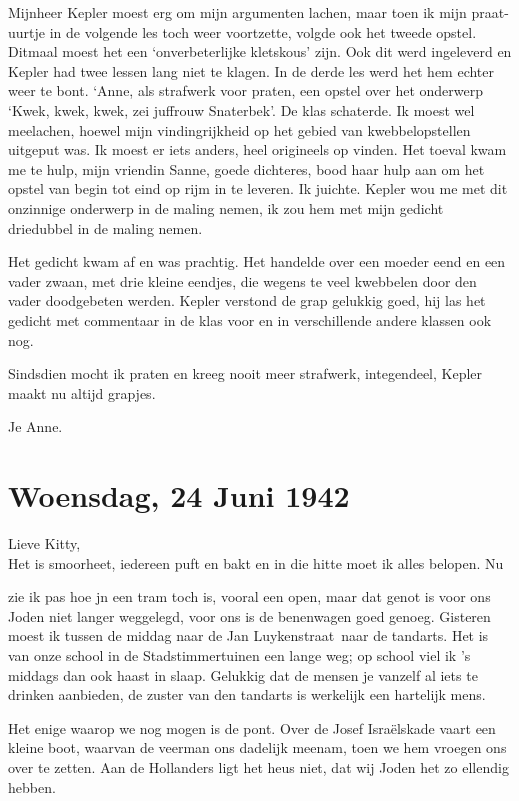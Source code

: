 \documentclass{book}
\begin{document}
Mijnheer Kepler moest erg om mijn argumenten lachen, maar toen ik mijn
praat-uurtje in de volgende les toch weer voortzette, volgde ook het
tweede opstel. Ditmaal moest het een `onverbeterlijke kletskous' zijn.
Ook dit werd ingeleverd en Kepler had twee lessen lang niet te klagen.
In de derde les werd het hem echter weer te bont. `Anne, als strafwerk
voor praten, een opstel over het onderwerp `Kwek, kwek, kwek, zei
juffrouw Snaterbek'. De klas schaterde. Ik moest wel meelachen, hoewel
mijn vindingrijkheid op het gebied van kwebbelopstellen uitgeput was. Ik
moest er iets anders, heel origineels op vinden. Het toeval kwam me te
hulp, mijn vriendin Sanne, goede dichteres, bood haar hulp aan om het
opstel van begin tot eind op rijm in te leveren. Ik juichte. Kepler wou
me met dit onzinnige onderwerp in de maling nemen, ik zou hem met mijn
gedicht driedubbel in de maling nemen.

Het gedicht kwam af en was prachtig. Het handelde over een moeder eend
en een vader zwaan, met drie kleine eendjes, die wegens te veel
kwebbelen door den vader doodgebeten werden. Kepler verstond de grap
gelukkig goed, hij las het gedicht met commentaar in de klas voor en in
verschillende andere klassen ook nog.

Sindsdien mocht ik praten en kreeg nooit meer strafwerk, integendeel,
Kepler maakt nu altijd grapjes.

Je Anne.

\chapter{Woensdag, 24 Juni 1942}

Lieve Kitty,\\Het is smoorheet, iedereen puft en bakt en in die hitte
moet ik alles belopen. Nu

zie ik pas hoe jn een tram toch is, vooral een open, maar dat genot is
voor ons Joden niet langer weggelegd, voor ons is de benenwagen goed
genoeg. Gisteren moest ik tussen de middag naar de Jan Luykenstraat~naar
de tandarts. Het is van onze school in de Stadstimmertuinen een lange
weg; op school viel ik 's middags dan ook haast in slaap. Gelukkig dat
de mensen je vanzelf al iets te drinken aanbieden, de zuster van den
tandarts is werkelijk een hartelijk mens.

Het enige waarop we nog mogen is de pont. Over de Josef Israëlskade
vaart een kleine boot, waarvan de veerman ons dadelijk meenam, toen we
hem vroegen ons over te zetten. Aan de Hollanders ligt het heus niet,
dat wij Joden het zo ellendig hebben.
\end{document}
